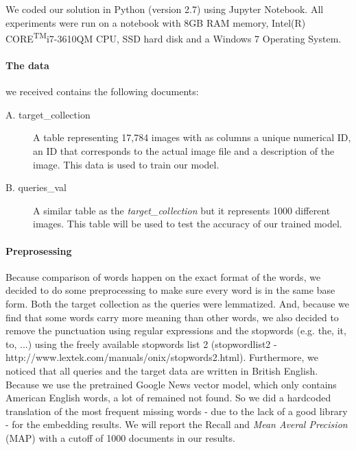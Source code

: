 We coded our solution in Python (version 2.7) using Jupyter Notebook. All experiments were run on a notebook with 8GB RAM memory, Intel(R) CORE\textsuperscript{TM}i7-3610QM CPU, SSD hard disk and a Windows 7 Operating System.

\paragraph{The data}
we received contains the following documents:
\begin{description}
	\item[A. target\_collection] A table representing 17,784 images with as columns a unique numerical ID, an ID that corresponds to the actual image file and a description of the image. This data is used to train our model.
	\item[B. queries\_val] A similar table as the \textit{target\_collection} but it represents 1000 different images. This table will be used to test the accuracy of our trained model.
\end{description}

\paragraph{Preprosessing}
Because comparison of words happen on the exact format of the words, we decided to do some preprocessing to make sure every word is in the same base form. Both the target collection as the queries were lemmatized. And, because we find that some words carry more meaning than other words, we also decided to remove the punctuation using regular expressions and the stopwords (e.g. the, it, to, ...) using the freely available stopwords list 2 (stopwordlist2 - http://www.lextek.com/manuals/onix/stopwords2.html).
\newline
\newline
Furthermore, we noticed that all queries and the target data are written in British English. Because we use the pretrained Google News vector model, which only contains American English words, a lot of remained not found. So we did a hardcoded translation of the most frequent missing words - due to the lack of a good library - for the embedding results.
\newline
\newline
We will report the Recall and \textit{Mean Averal Precision} (MAP) with a cutoff of 1000 documents in our results.